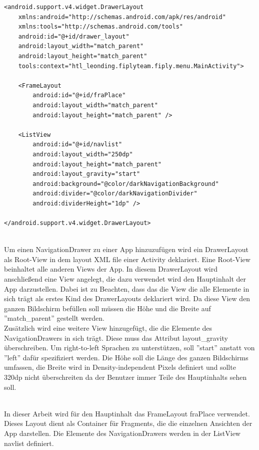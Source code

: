 \documentclass[FIPLY_base.tex]{subfiles}
\begin{document}
\newpage
\begin{lstlisting}
<android.support.v4.widget.DrawerLayout
	xmlns:android="http://schemas.android.com/apk/res/android"
	xmlns:tools="http://schemas.android.com/tools"
	android:id="@+id/drawer_layout"
	android:layout_width="match_parent"
	android:layout_height="match_parent"
	tools:context="htl_leonding.fiplyteam.fiply.menu.MainActivity">

	<FrameLayout
		android:id="@+id/fraPlace"
		android:layout_width="match_parent"
		android:layout_height="match_parent" />

	<ListView
		android:id="@+id/navlist"
		android:layout_width="250dp"
		android:layout_height="match_parent"
		android:layout_gravity="start"
		android:background="@color/darkNavigationBackground"
		android:divider="@color/darkNavigationDivider"
		android:dividerHeight="1dp" />

</android.support.v4.widget.DrawerLayout>
\end{lstlisting}
\ \\
Um einen NavigationDrawer zu einer App hinzuzufügen wird ein DrawerLayout als Root-View in dem layout XML file einer Activity deklariert. 
Eine Root-View beinhaltet alle anderen Views der App. 
In diesem DrawerLayout wird anschließend eine View angelegt, die dazu verwendet wird den Hauptinhalt der App darzustellen.
Dabei ist zu Beachten, dass das die View die alle Elemente in sich trägt als erstes Kind des DrawerLayouts deklariert wird.
Da diese View den ganzen Bildschirm befüllen soll müssen die Höhe und die Breite auf ''match\_parent'' gestellt werden.
\ \\
Zusätzlich wird eine weitere View hinzugefügt, die die Elemente des NavigationDrawers in sich trägt. 
Diese muss das Attribut layout\_gravity überschreiben. 
Um right-to-left Sprachen zu unterstützen, soll ''start'' anstatt von ''left'' dafür spezifiziert werden. 
Die Höhe soll die Länge des ganzen Bildschirms umfassen, die Breite wird in Density-independent Pixels definiert und sollte 320dp nicht überschreiten da der Benutzer immer Teile des Hauptinhalts sehen soll. 

\ \\
In dieser Arbeit wird für den Hauptinhalt das FrameLayout fraPlace verwendet. 
Dieses Layout dient als Container für Fragments, die die einzelnen Ansichten der App darstellen.
Die Elemente des NavigationDrawers werden in der ListView navlist definiert.
\end{document}
